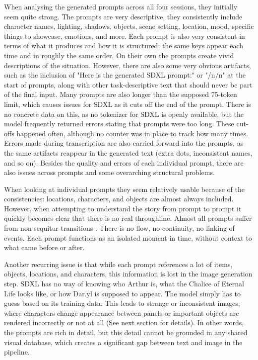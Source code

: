 When analysing the generated prompts across all four sessions, they initially seem quite strong. The prompts are very descriptive, they consistently include character names, lighting, shadows, objects, scene setting, location, mood, specific things to showcase, emotions, and more. Each prompt is also very consistent in terms of what it produces and how it is structured: the same keys appear each time and in roughly the same order. On their own the prompts create vivid descriptions of the situation. However, there are also some very obvious artifacts, such as the inclusion of "Here is the generated SDXL prompt:" or "/n/n" at the start of prompts, along with other task-descriptive text that should never be part of the final input. Many prompts are also longer than the supposed 75-token limit, which causes issues for SDXL as it cuts off the end of the prompt. There is no concrete data on this, as no tokenizer for SDXL is openly available, but the model frequently returned errors stating that prompts were too long. These cut-offs happened often, although no counter was in place to track how many times. Errors made during transcription are also carried forward into the prompts, as the same artifacts reappear in the generated text (extra dots, inconsistent names, and so on). Besides the quality and errors of each individual prompt, there are also issues across prompts and some overarching structural problems.

When looking at individual prompts they seem relatively usable because of the consistencies: locations, characters, and objects are almost always included. However, when attempting to understand the story from prompt to prompt it quickly becomes clear that there is no real throughline. Almost all prompts suffer from non-sequitur transitions \cite{mccloud1993understanding}. There is no flow, no continuity, no linking of events. Each prompt functions as an isolated moment in time, without context to what came before or after.

Another recurring issue is that while each prompt references a lot of items, objects, locations, and characters, this information is lost in the image generation step. SDXL has no way of knowing who Arthur is, what the Chalice of Eternal Life looks like, or how Dar.yl is supposed to appear. The model simply has to guess based on its training data. This leads to strange or inconsistent images, where characters change appearance between panels or important objects are rendered incorrectly or not at all (See next section for details). In other words, the prompts are rich in detail, but this detail cannot be grounded in any shared visual database, which creates a significant gap between text and image in the pipeline.

